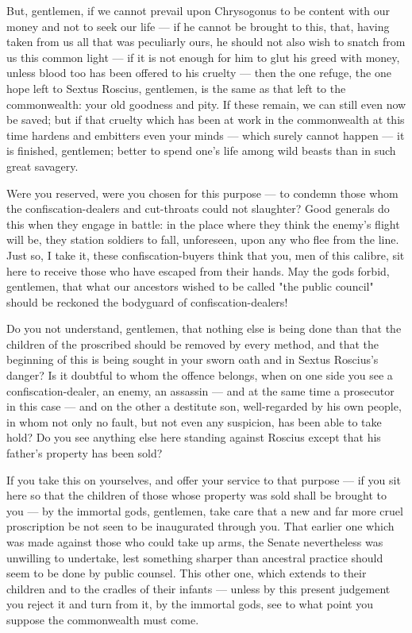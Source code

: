  But, gentlemen, if we cannot prevail upon Chrysogonus to be content with our money and not to seek our life --- if he cannot be brought to this, that, having taken from us all that was peculiarly ours, he should not also wish to snatch from us this common light --- if it is not enough for him to glut his greed with money, unless blood too has been offered to his cruelty --- then the one refuge, the one hope left to Sextus Roscius, gentlemen, is the same as that left to the commonwealth: your old goodness and pity. If these remain, we can still even now be saved; but if that cruelty which has been at work in the commonwealth at this time hardens and embitters even your minds --- which surely cannot happen --- it is finished, gentlemen; better to spend one's life among wild beasts than in such great savagery.

 Were you reserved, were you chosen for this purpose --- to condemn those whom the confiscation-dealers and cut-throats could not slaughter? Good generals do this when they engage in battle: in the place where they think the enemy's flight will be, they station soldiers to fall, unforeseen, upon any who flee from the line. Just so, I take it, these confiscation-buyers think that you, men of this calibre, sit here to receive those who have escaped from their hands. May the gods forbid, gentlemen, that what our ancestors wished to be called "the public council" should be reckoned the bodyguard of confiscation-dealers!

 Do you not understand, gentlemen, that nothing else is being done than that the children of the proscribed should be removed by every method, and that the beginning of this is being sought in your sworn oath and in Sextus Roscius's danger? Is it doubtful to whom the offence belongs, when on one side you see a confiscation-dealer, an enemy, an assassin --- and at the same time a prosecutor in this case --- and on the other a destitute son, well-regarded by his own people, in whom not only no fault, but not even any suspicion, has been able to take hold? Do you see anything else here standing against Roscius except that his father's property has been sold?

 If you take this on yourselves, and offer your service to that purpose --- if you sit here so that the children of those whose property was sold shall be brought to you --- by the immortal gods, gentlemen, take care that a new and far more cruel proscription be not seen to be inaugurated through you. That earlier one which was made against those who could take up arms, the Senate nevertheless was unwilling to undertake, lest something sharper than ancestral practice should seem to be done by public counsel. This other one, which extends to their children and to the cradles of their infants --- unless by this present judgement you reject it and turn from it, by the immortal gods, see to what point you suppose the commonwealth must come.


